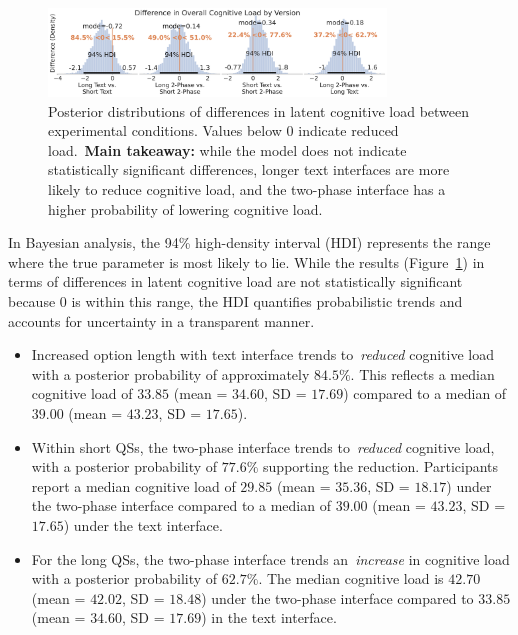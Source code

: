 \begin{figure}[ht]
    \centering
    \includegraphics[width=0.8\textwidth]{content/image/cog/weighted_cog_version_single_row.pdf}
    \caption{Posterior distributions of differences in latent cognitive load between experimental conditions. Values below 0 indicate reduced load.~\textbf{Main takeaway:} while the model does not indicate statistically significant differences, longer text interfaces are more likely to reduce cognitive load, and the two-phase interface has a higher probability of lowering cognitive load.}
    \label{fig:weighted_cog_version}
\end{figure}

In Bayesian analysis, the 94\% high-density interval (HDI) represents the range where the true parameter is most likely to lie. While the results (Figure~\ref{fig:weighted_cog_version}) in terms of differences in latent cognitive load are not statistically significant because 0 is within this range, the HDI quantifies probabilistic trends and accounts for uncertainty in a transparent manner.
\begin{itemize}[leftmargin=*]
    \item Increased option length with text interface trends to~\textit{reduced} cognitive load with a posterior probability of approximately $84.5\%$. This reflects a median cognitive load of $33.85$ (mean = $34.60$, SD = $17.69$) compared to a median of $39.00$ (mean = $43.23$, SD = $17.65$).
    \item Within short QSs, the two-phase interface trends to~\textit{reduced} cognitive load, with a posterior probability of $77.6\%$ supporting the reduction. Participants report a median cognitive load of $29.85$ (mean = $35.36$, SD = $18.17$) under the two-phase interface compared to a median of $39.00$ (mean = $43.23$, SD = $17.65$) under the text interface.
    \item For the long QSs, the two-phase interface trends an~\textit{increase} in cognitive load with a posterior probability of $62.7\%$. The median cognitive load is $42.70$ (mean = $42.02$, SD = $18.48$) under the two-phase interface compared to $33.85$ (mean = $34.60$, SD = $17.69$) in the text interface.
\end{itemize}

